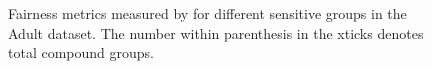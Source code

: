 \begin{figure}
	\centering
	\caption{Fairness metrics measured by {\justicia} for different sensitive groups in the Adult dataset. The number within parenthesis in the xticks denotes total compound groups.}
	\label{fairness_justicia_fig:sensitive_groups}
\end{figure}




